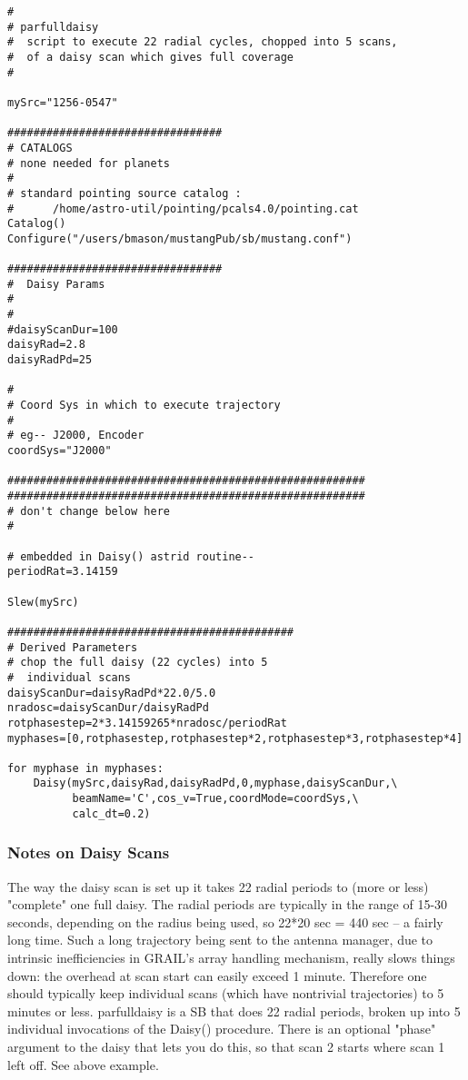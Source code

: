 \begin{lstlisting}
#
# parfulldaisy
#  script to execute 22 radial cycles, chopped into 5 scans,
#  of a daisy scan which gives full coverage
#

mySrc="1256-0547"

#################################
# CATALOGS
# none needed for planets
#
# standard pointing source catalog :
#      /home/astro-util/pointing/pcals4.0/pointing.cat
Catalog()
Configure("/users/bmason/mustangPub/sb/mustang.conf")

#################################
#  Daisy Params
#
#
#daisyScanDur=100
daisyRad=2.8
daisyRadPd=25

#
# Coord Sys in which to execute trajectory
#
# eg-- J2000, Encoder
coordSys="J2000"

#######################################################
#######################################################
# don't change below here
#

# embedded in Daisy() astrid routine--
periodRat=3.14159

Slew(mySrc)							       

############################################
# Derived Parameters
# chop the full daisy (22 cycles) into 5
#  individual scans
daisyScanDur=daisyRadPd*22.0/5.0
nradosc=daisyScanDur/daisyRadPd
rotphasestep=2*3.14159265*nradosc/periodRat
myphases=[0,rotphasestep,rotphasestep*2,rotphasestep*3,rotphasestep*4]

for myphase in myphases:
	Daisy(mySrc,daisyRad,daisyRadPd,0,myphase,daisyScanDur,\
	      beamName='C',cos_v=True,coordMode=coordSys,\
	      calc_dt=0.2)

\end{lstlisting}

\subsubsection{Notes on Daisy Scans}\label{sec:notesdaisy}
The way the daisy scan is set up it takes 22 radial periods to (more or less)
 "complete" one full daisy.  The radial periods are typically in the 
range of 15-30 seconds, depending on the radius being used, 
so 22*20 sec = 440 sec -- a fairly long time. 
Such a long trajectory being sent to the antenna manager, 
due to intrinsic inefficiencies in GRAIL's array handling mechanism, 
really slows things down: the overhead at scan start can easily exceed 1 minute.  
Therefore one should typically keep individual scans 
(which have nontrivial trajectories) to 5 minutes or less.  
parfulldaisy is a SB that does 22 radial periods, 
broken up into 5 individual invocations of the Daisy() procedure.  
There is an optional "phase" argument to the daisy that lets you do this, 
so that scan 2 starts where scan 1 left off. See above example.


